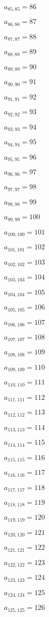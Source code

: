 \documentclass[a4paper,12pt]{article}
\begin{document}
$a _{ 85, 85 } = 86$

$a _{ 86, 86 } = 87$

$a _{ 87, 87 } = 88$

$a _{ 88, 88 } = 89$

$a _{ 89, 89 } = 90$

$a _{ 90, 90 } = 91$

$a _{ 91, 91 } = 92$

$a _{ 92, 92 } = 93$

$a _{ 93, 93 } = 94$

$a _{ 94, 94 } = 95$

$a _{ 95, 95 } = 96$

$a _{ 96, 96 } = 97$

$a _{ 97, 97 } = 98$

$a _{ 98, 98 } = 99$

$a _{ 99, 99 } = 100$

$a _{ 100, 100 } = 101$

$a _{ 101, 101 } = 102$

$a _{ 102, 102 } = 103$

$a _{ 103, 103 } = 104$

$a _{ 104, 104 } = 105$

$a _{ 105, 105 } = 106$

$a _{ 106, 106 } = 107$

$a _{ 107, 107 } = 108$

$a _{ 108, 108 } = 109$

$a _{ 109, 109 } = 110$

$a _{ 110, 110 } = 111$

$a _{ 111, 111 } = 112$

$a _{ 112, 112 } = 113$

$a _{ 113, 113 } = 114$

$a _{ 114, 114 } = 115$

$a _{ 115, 115 } = 116$

$a _{ 116, 116 } = 117$

$a _{ 117, 117 } = 118$

$a _{ 118, 118 } = 119$

$a _{ 119, 119 } = 120$

$a _{ 120, 120 } = 121$

$a _{ 121, 121 } = 122$

$a _{ 122, 122 } = 123$

$a _{ 123, 123 } = 124$

$a _{ 124, 124 } = 125$

$a _{ 125, 125 } = 126$
\end{document}
